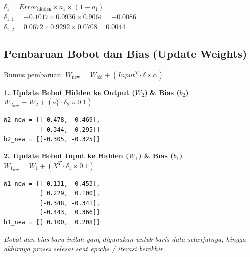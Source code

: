 \documentclass[12pt,a4paper]{article}
\begin{document}
\vspace{0.2cm}
$\delta_1 = Error_{\text{hidden}} \times a_1 \times (1 - a_1)$ \\
$\delta_{1,1} = -0.1017 \times 0.0936 \times 0.9064 = -0.0086$ \\
$\delta_{1,2} = 0.0672 \times 0.9292 \times 0.0708 = 0.0044$

\subsection{Pembaruan Bobot dan Bias (Update Weights)}
Rumus pembaruan: $W_{\text{new}} = W_{\text{old}} + (Input^T \cdot \delta \times \alpha)$

\vspace{0.3cm}
\textbf{1. Update Bobot Hidden ke Output ($W_2$) \& Bias ($b_2$)} \\
$W_{2_{\text{new}}} = W_2 + (a_1^T \cdot \delta_2 \times 0.1)$
\begin{lstlisting}
W2_new = [[-0.478,  0.469],
          [ 0.344, -0.295]]
b2_new = [[-0.305, -0.325]]
\end{lstlisting}

\vspace{0.3cm}
\textbf{2. Update Bobot Input ke Hidden ($W_1$) \& Bias ($b_1$)} \\
$W_{1_{\text{new}}} = W_1 + (X^T \cdot \delta_1 \times 0.1)$
\begin{lstlisting}
W1_new = [[-0.131,  0.453],
          [ 0.229,  0.100],
          [-0.348, -0.341],
          [-0.443,  0.366]]
b1_new = [[ 0.100,  0.208]]
\end{lstlisting}

\textit{Bobot dan bias baru inilah yang digunakan untuk baris data selanjutnya, hingga akhirnya proses selesai saat epochs / iterasi berakhir.}
\end{document}
